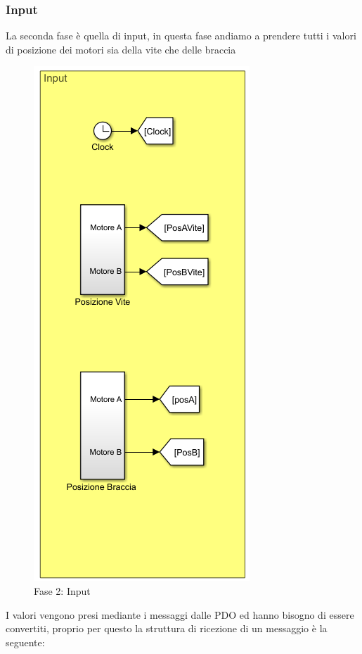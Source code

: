 \subsubsection*{Input}
La seconda fase è quella di input, in questa fase andiamo a prendere tutti i valori di posizione dei motori sia della vite che delle braccia
\begin{figure}[ht]
	\begin{center}
		\includegraphics[scale=0.65]{Immagini/Sperimentale/Input}
		\caption{Fase 2: Input}
		\label{fig:Input}
	\end{center}
\end{figure}
I valori vengono presi mediante i messaggi dalle PDO ed hanno bisogno di essere convertiti, proprio per questo la struttura di ricezione di un messaggio è la seguente: 
